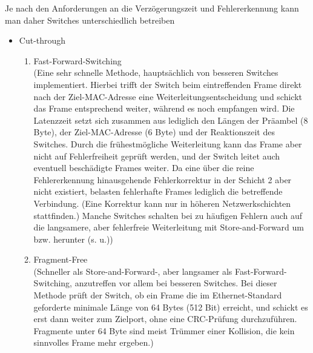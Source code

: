 Je nach den Anforderungen an die Verzögerungszeit und Fehlererkennung kann man daher Switches unterschiedlich betreiben
\begin{itemize}
\item Cut-through
\begin{enumerate}
\item Fast-Forward-Switching\\
(Eine sehr schnelle Methode, hauptsächlich von besseren Switches implementiert. Hierbei trifft der Switch beim eintreffenden Frame direkt nach der Ziel-MAC-Adresse eine Weiterleitungsentscheidung und schickt das Frame entsprechend weiter, während es noch empfangen wird. Die Latenzzeit setzt sich zusammen aus lediglich den Längen der Präambel (8 Byte), der Ziel-MAC-Adresse (6 Byte) und der Reaktionszeit des Switches. Durch die frühestmögliche Weiterleitung kann das Frame aber nicht auf Fehlerfreiheit geprüft werden, und der Switch leitet auch eventuell beschädigte Frames weiter. Da eine über die reine Fehlererkennung hinausgehende Fehlerkorrektur in der Schicht 2 aber nicht existiert, belasten fehlerhafte Frames lediglich die betreffende Verbindung. (Eine Korrektur kann nur in höheren Netzwerkschichten stattfinden.) Manche Switches schalten bei zu häufigen Fehlern auch auf die langsamere, aber fehlerfreie Weiterleitung mit Store-and-Forward um bzw. herunter (s. u.))

\item Fragment-Free \\
(Schneller als Store-and-Forward-, aber langsamer als Fast-Forward-Switching, anzutreffen vor allem bei besseren Switches. Bei dieser Methode prüft der Switch, ob ein Frame die im Ethernet-Standard geforderte minimale Länge von 64 Bytes (512 Bit) erreicht, und schickt es erst dann weiter zum Zielport, ohne eine CRC-Prüfung durchzuführen. Fragmente unter 64 Byte sind meist Trümmer einer Kollision, die kein sinnvolles Frame mehr ergeben.)
\end{enumerate}


\end{itemize}
